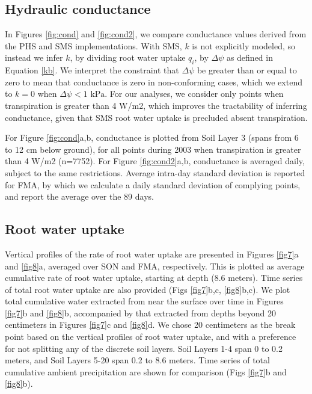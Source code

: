 \documentclass[draft,linenumbers]{agujournal}
\begin{document}
\subsection{Hydraulic conductance}
    In Figures \ref{fig:cond} and \ref{fig:cond2}, we compare conductance values derived from the PHS and SMS implementations.
    With SMS, $k$ is not explicitly modeled, so instead we infer $k$, 
    by dividing root water uptake $q_i$, by $\Delta\psi$ as defined in Equation \ref{kb}.
    We interpret the constraint that $\Delta\psi$ be greater than or equal to zero to mean 
    that conductance is zero in non-conforming cases, which we extend to $k=0$ when $\Delta\psi<\text{1 kPa}$.
    For our analyses, we consider only points when transpiration is greater than 4 W/m2, which improves the tractability of inferring conductance,
    given that SMS root water uptake is precluded absent transpiration. 
    
    For Figure \ref{fig:cond}a,b, conductance is plotted from Soil Layer 3 (spans from 6 to 12 cm below ground),
     for all points during 2003 when transpiration is greater than 4 W/m2 (n=7752).
    For Figure \ref{fig:cond2}a,b, conductance is averaged daily, subject to the same restrictions.
    Average intra-day standard deviation is reported for FMA, by which we calculate a daily standard deviation of complying points, and report the average over the 89 days.


\subsection{Root water uptake}
    Vertical profiles of the rate of root water uptake are presented in Figures \ref{fig7}a and \ref{fig8}a, averaged over SON and FMA, respectively.
    This is plotted as average cumulative rate of root water uptake, starting at depth (8.6 meters).
    Time series of total root water uptake are also provided (Figs \ref{fig7}b,c, \ref{fig8}b,c).
    We plot total cumulative water extracted from near the surface over time in Figures \ref{fig7}b and \ref{fig8}b, 
    accompanied by that extracted from depths beyond 20 centimeters in Figures \ref{fig7}c and \ref{fig8}d.
    We chose 20 centimeters as the break point based on the vertical profiles of root water uptake, and with a preference for not splitting any of the discrete soil layers.
    Soil Layers 1-4 span 0 to 0.2 meters, and Soil Layers 5-20 span 0.2 to 8.6 meters.
    Time series of total cumulative ambient precipitation are shown for comparison (Figs \ref{fig7}b and \ref{fig8}b).
    
\end{document}
